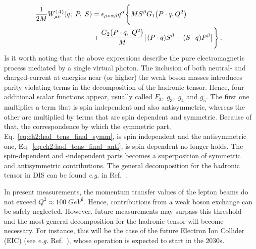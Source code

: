 \begin{equation}
  \begin{split}
    \frac{1}{2M} W_{\mu \nu}^{(A)} (q; \; P, \; S) & = \epsilon_{\mu \nu \alpha \beta} q^{\alpha} \Biggl\{ M S^{\beta} G_1 \qty(P\cdot q, Q^2) \Biggr.\\
    & +  \Biggl. \frac{G_2 \qty(P \cdot q,\;Q^2)}{M} \qty[ (P \cdot q) S^{\beta} - (S \cdot q) P^{\beta} ]\Biggr\} \,,
  \end{split}  
\end{equation}
Is it worth noting that the above expressions describe the pure electromagnetic process mediated by a single virtual photon. The inclusion of both neutral- and charged-current at energies near (or higher) the weak boson masses introduces parity violating terms in the decomposition of the hadronic tensor. Hence, four additional scalar functions appear, usually called $F_3, \; g_3,\; g_4$ and $g_5$. The first one multiplies a term that is spin independent and also antisymmetric, whereas the other are multiplied by terms that are spin dependent and symmetric. Because of that, the correspondence by which the symmetric part, Eq.~\eqref{eq:ch2:had_tens_final_symm}, is spin independent and the antisymmetric one, Eq.~\eqref{eq:ch2:had_tens_final_anti}, is spin dependent no longer holds. The spin-dependent and -independent parts becomes a superposition of symmetric and antisymmetric contributions. The general decomposition for the hadronic tensor in DIS can be found \textit{e.g.} in Ref.~\cite{Anselmino:1993tc}.%

In present measurements, the momentum transfer values of the lepton beams do not exceed  $Q^2 \approx 100 \; GeV^2$. Hence, contributions from a weak boson exchange can be safely neglected. However, future measurements may surpass this threshold and the most general decomposition for the hadronic tensor will become necessary. For instance, this will be the case of the future Electron Ion Collider (EIC) (see \textit{e.g.} Ref.~\cite{Borsa:2020lsz}), whose operation is expected to start in the 2030s.


